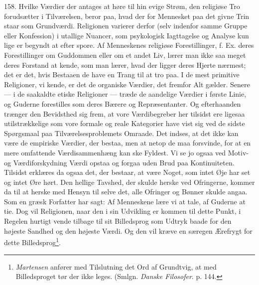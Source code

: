 \documentclass[12pt,a4paper]{book}
\newcommand{\opage}[1]{\marginnote{\footnotesize\textit{[#1]}}}
\begin{document}
158. Hvilke Værdier der antages at høre til hin evige Strøm, den religiøse Tro forudsætter i
Tilværelsen, beror paa, hvad der for Mennesket paa det givne Trin staar som Grundværdi.
Religionen varierer derfor (selv indenfor samme Gruppe eller Konfession) i utallige Nuancer,
som psykologisk Iagttagelse og Analyse kun lige er begyndt at efter%
\opage{377}spore. Af Menneskenes
religiøse Forestillinger, f. Ex. deres Forestillinger om Guddommen eller om et andet Liv,
lærer man ikke saa meget deres Forstand at kende, som man lærer, hvad der ligger deres Hjerte
nærmest; det er det, hvis Bestaaen de have en Trang til at tro paa. I de mest primitive
Religioner, vi kende, er det de organiske Værdier, det fremfor Alt gælder. Senere --- i de
saakaldte etiske Religioner --- træde de aandelige Værdier i første Linie, og Guderne
forestilles som deres Bærere og Repræsentanter. Og efterhaanden trænger den Bevidsthed sig
frem, at vore Værdibegreber her tilsidst ere ligesaa utilstrækkelige som vore formale og
reale Kategorier have vist sig ved de sidste Spørgsmaal paa Tilværelsesproblemets Omraade.
Det indses, at det ikke kan være de empiriske Værdier, der bestaa, men at netop de maa
forsvinde, for at en mere omfattende Værdisammenhæng kan ske Fyldest. Vi se jo ogsaa ved
Motiv- og Værdiforskydning Værdi opstaa og forgaa uden Brud paa Kontinuiteten. Tilsidst
erklæres da ogsaa det, der bestaar, at være Noget, som intet Øje har set og intet Øre hørt.
Den hellige Tavshed, der skulde herske ved Ofringerne, kommer da til at herske med Hensyn til
selve det, alle Ofringer og Bønner skulde angaa. Som en græsk Forfatter har sagt: Af Menneskene lære vi at tale, af Guderne at tie. Dog vil Religionen, naar den i sin Udvikling
er kommen til dette Punkt, i Regelen hurtigt vende tilbage til sit Billedsprog som Udtryk
baade for den højeste Sandhed og den højeste Værdi. Og den vil kræve en særegen Ærefrygt for
dette Billedsprog\footnote{\emph{Martensen} anfører med Tilslutning det Ord af Grundtvig, at
med Billedsproget tør der ikke leges. (Smlgn. \emph{Danske Filosofer}. p. 144.}.
\end{document}
